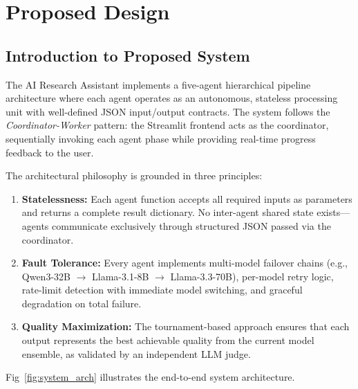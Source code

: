 \documentclass[a4paper,12pt,openany]{report}
\begin{document}

\chapter{Proposed Design}

\section{Introduction to Proposed System}

The AI Research Assistant implements a five-agent hierarchical pipeline architecture where each agent operates as an autonomous, stateless processing unit with well-defined JSON input/output contracts. The system follows the \textit{Coordinator-Worker} pattern: the Streamlit frontend acts as the coordinator, sequentially invoking each agent phase while providing real-time progress feedback to the user.

The architectural philosophy is grounded in three principles:

\begin{enumerate}[label=\arabic*., leftmargin=2cm]
\item \textbf{Statelessness:} Each agent function accepts all required inputs as parameters and returns a complete result dictionary. No inter-agent shared state exists---agents communicate exclusively through structured JSON passed via the coordinator.

\item \textbf{Fault Tolerance:} Every agent implements multi-model failover chains (e.g., Qwen3-32B $\rightarrow$ Llama-3.1-8B $\rightarrow$ Llama-3.3-70B), per-model retry logic, rate-limit detection with immediate model switching, and graceful degradation on total failure.

\item \textbf{Quality Maximization:} The tournament-based approach ensures that each output represents the best achievable quality from the current model ensemble, as validated by an independent LLM judge.
\end{enumerate}

Fig~\ref{fig:system_arch} illustrates the end-to-end system architecture.
\end{document}

